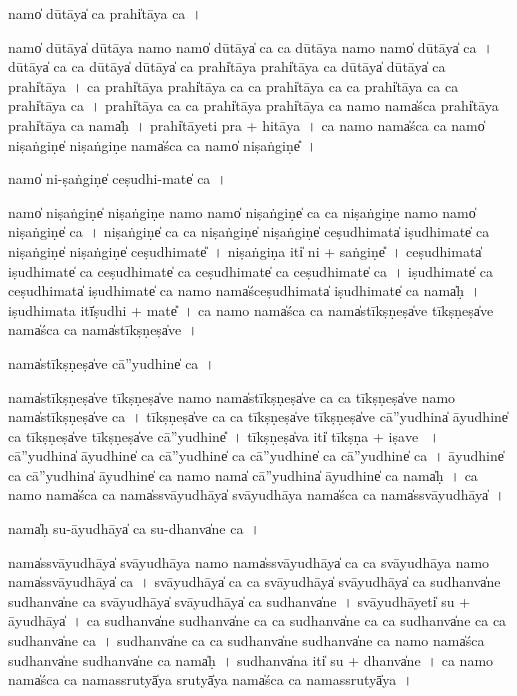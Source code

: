 \documentclass[parskip, DIV=14]{scrartcl}
\begin{document}
{namo̍ dū॒tāya̍ ca॒ prahi̍tāya ca॒~।

namo̍ dū॒tāya̍ dū॒tāya॒ namo॒ namo̍ dū॒tāya̍ ca ca dū॒tāya॒ namo॒ namo̍ dū॒tāya̍ ca~।
dū॒tāya̍ ca ca dū॒tāya̍ dū॒tāya̍ ca॒ prahi̍tāya॒ prahi̍tāya ca dū॒tāya̍ dū॒tāya̍ ca॒ prahi̍tāya~।
ca॒ prahi̍tāya॒ prahi̍tāya ca ca॒ prahi̍tāya ca ca॒ prahi̍tāya ca ca॒ prahi̍tāya ca~।
prahi̍tāya ca ca॒ prahi̍tāya॒ prahi̍tāya ca॒ namo॒ nama̍śca॒ prahi̍tāya॒ prahi̍tāya ca॒ nama̍ḥ~।
prahi̍tā॒yeti॒ pra + hi॒tā॒ya॒~।
ca॒ namo॒ nama̍śca ca॒ namo̍ niṣa॒ṅgiṇe̍ niṣa॒ṅgiṇe॒ nama̍śca ca॒ namo̍ niṣa॒ṅgiṇe̎~।

namo̍ ni-ṣa॒ṅgiṇe̍ ceṣudhi॒-mate̍ ca॒~।

namo̍ niṣa॒ṅgiṇe̍ niṣa॒ṅgiṇe॒ namo॒ namo̍ niṣa॒ṅgiṇe̍ ca ca niṣa॒ṅgiṇe॒ namo॒ namo̍ niṣa॒ṅgiṇe̍ ca~।
 ni॒ṣa॒ṅgiṇe̍ ca ca niṣa॒ṅgiṇe̍ niṣa॒ṅgiṇe̍ ceṣudhi॒mata̍ iṣudhi॒mate̍ ca niṣa॒ṅgiṇe̍ niṣa॒ṅgiṇe̍ ceṣudhi॒mate̎~।
 ni॒ṣa॒ṅgiṇa॒ iti̍ ni +  sa॒ṅgiṇe̎~।
 ce॒ṣu॒dhi॒mata̍ iṣudhi॒mate̍ ca ceṣudhi॒mate̍ ca ceṣudhi॒mate̍ ca ceṣudhi॒mate̍ ca~।
 i॒ṣu॒dhi॒mate̍ ca ceṣudhi॒mata̍ iṣudhi॒mate̍ ca॒ namo॒ nama̍śceṣudhi॒mata̍ iṣudhi॒mate̍ ca॒ nama̍ḥ~।
 i॒ṣu॒dhi॒mata॒ itī̍ṣudhi + mate̎~।
ca॒ namo॒ nama̍śca ca॒ nama̍stī॒kṣṇeṣa̍ve tī॒kṣṇeṣa̍ve॒ nama̍śca ca॒ nama̍stī॒kṣṇeṣa̍ve~।

nama̍stī॒kṣṇeṣa̍ve cā''yu॒dhine̍ ca॒~।

nama̍stī॒kṣṇeṣa̍ve tī॒kṣṇeṣa̍ve॒ namo॒ nama̍stī॒kṣṇeṣa̍ve ca ca tī॒kṣṇeṣa̍ve॒ namo॒ nama̍stī॒kṣṇeṣa̍ve ca~।
tī॒kṣṇeṣa̍ve ca ca tī॒kṣṇeṣa̍ve tī॒kṣṇeṣa̍ve cā''yu॒dhina̍ āyu॒dhine̍ ca tī॒kṣṇeṣa̍ve tī॒kṣṇeṣa̍ve cā''yu॒dhine̎~।
tī॒kṣṇeṣa̍va॒ iti̍ tī॒kṣṇa + i॒ṣa॒ve॒ ~।
cā॒''yu॒dhina̍ āyu॒dhine̍ ca cā''yu॒dhine̍ ca cā''yu॒dhine̍ ca cā''yu॒dhine̍ ca~।
ā॒yu॒dhine̍ ca cā''yu॒dhina̍ āyu॒dhine̍ ca॒ namo॒ nama̍ cā''yu॒dhina̍ āyu॒dhine̍ ca॒ nama̍ḥ~।
ca॒ namo॒ nama̍śca ca॒ nama̍ssvāyu॒dhāya̍ svāyu॒dhāya॒ nama̍śca ca॒ nama̍ssvāyu॒dhāya̍~।

nama̍ḥ su-āyu॒dhāya̍ ca su॒-dhanva̍ne ca॒~।

nama̍ssvāyu॒dhāya̍ svāyu॒dhāya॒ namo॒ nama̍ssvāyu॒dhāya̍ ca ca svāyu॒dhāya॒ namo॒ nama̍ssvāyu॒dhāya̍ ca~।
svā॒yu॒dhāya̍ ca ca svāyu॒dhāya̍ svāyu॒dhāya̍ ca su॒dhanva̍ne su॒dhanva̍ne ca svāyu॒dhāya̍ svāyu॒dhāya̍ ca su॒dhanva̍ne~।
svā॒yu॒dhāyeti̍ su + ā॒yu॒dhāya̍~।
ca॒ su॒dhanva̍ne su॒dhanva̍ne ca ca su॒dhanva̍ne ca ca su॒dhanva̍ne ca ca su॒dhanva̍ne ca~।
su॒dhanva̍ne ca ca su॒dhanva̍ne su॒dhanva̍ne ca॒ namo॒ nama̍śca su॒dhanva̍ne su॒dhanva̍ne ca॒ nama̍ḥ~।
su॒dhanva̍na॒ iti̍  su + dhanva̍ne~।
ca॒ namo॒ nama̍śca ca॒ nama॒ssrutyā̍ya॒ srutyā̍ya॒ nama̍śca ca॒ nama॒ssrutyā̍ya~।

}
\end{document}
